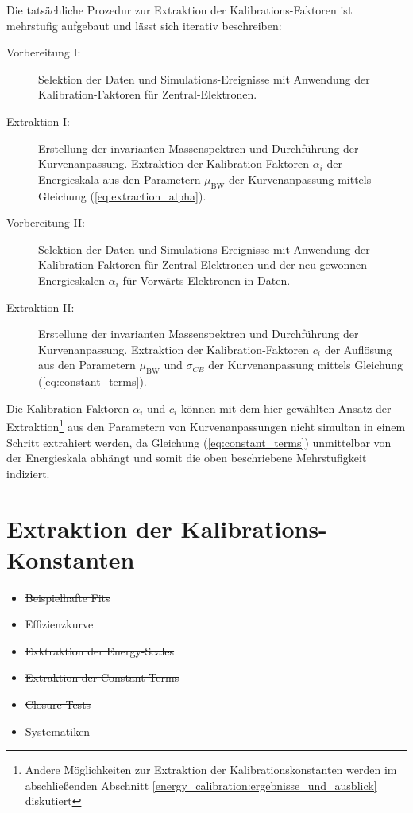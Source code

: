 Die tatsächliche Prozedur zur Extraktion der Kalibrations-Faktoren ist
mehrstufig aufgebaut und lässt sich iterativ beschreiben:
\begin{description}
    \item[Vorbereitung I:]
        Selektion der Daten und Simulations-Ereignisse mit Anwendung der
        Kalibration-Faktoren für Zentral-Elektronen.
    \item[Extraktion I:]
        Erstellung der invarianten Massenspektren und Durchführung der
        Kurvenanpassung. Extraktion der Kalibration-Faktoren $\alpha_i$ der
        Energieskala aus den Parametern $\mu_\text{BW}$ der Kurvenanpassung
        mittels Gleichung (\ref{eq:extraction_alpha}).
    \item[Vorbereitung II:]
        Selektion der Daten und Simulations-Ereignisse mit Anwendung der
        Kalibration-Faktoren für Zentral-Elektronen und der neu gewonnen
        Energieskalen $\alpha_i$ für Vorwärts-Elektronen in Daten.
    \item[Extraktion II:]
        Erstellung der invarianten Massenspektren und Durchführung der
        Kurvenanpassung. Extraktion der Kalibration-Faktoren $c_i$ der
        Auflösung aus den Parametern $\mu_\text{BW}$ und $\sigma_{CB}$ der
        Kurvenanpassung mittels Gleichung (\ref{eq:constant_terms}).
\end{description}
Die Kalibration-Faktoren $\alpha_i$ und $c_i$ können mit dem hier gewählten
Ansatz der Extraktion\footnote{Andere Möglichkeiten zur Extraktion der
Kalibrationskonstanten werden im abschließenden Abschnitt
\ref{energy_calibration:ergebnisse_und_ausblick} diskutiert} aus den Parametern
von Kurvenanpassungen nicht simultan in einem Schritt extrahiert werden, da
Gleichung (\ref{eq:constant_terms}) unmittelbar von der Energieskala abhängt
und somit die oben beschriebene Mehrstufigkeit indiziert.



%
\section{Extraktion der Kalibrations-Konstanten}
\label{energy_calibration:extraktion_der_kalibrations-konstanten}

\begin{itemize}
    \item \sout{Beispielhafte Fits}
    \item \sout{Effizienzkurve}
    \item \sout{Exktraktion der Energy-Scales}
    \item \sout{Extraktion der Constant-Terms}
    \item \sout{Closure-Tests}
    \item Systematiken
\end{itemize}

